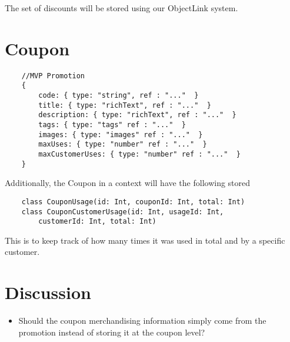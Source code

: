\documentclass[11pt]{article}
\begin{document}
The set of discounts will be stored using our ObjectLink system.

\section{Coupon}

\begin{lstlisting}
    //MVP Promotion
    {
        code: { type: "string", ref : "..."  }
        title: { type: "richText", ref : "..."  }
        description: { type: "richText", ref : "..."  }
        tags: { type: "tags" ref : "..."  }
        images: { type: "images" ref : "..."  }
        maxUses: { type: "number" ref : "..."  }
        maxCustomerUses: { type: "number" ref : "..."  }
    }
\end{lstlisting}

Additionally, the Coupon in a context will have the following stored

\begin{lstlisting}
    class CouponUsage(id: Int, couponId: Int, total: Int) 
    class CouponCustomerUsage(id: Int, usageId: Int, 
        customerId: Int, total: Int) 
\end{lstlisting}

This is to keep track of how many times it was used in total and by a specific
customer.



\section{Discussion}

\begin{itemize}
    \item Should the coupon merchandising information simply come from the promotion
        instead of storing it at the coupon level?
\end{itemize}
\end{document}
